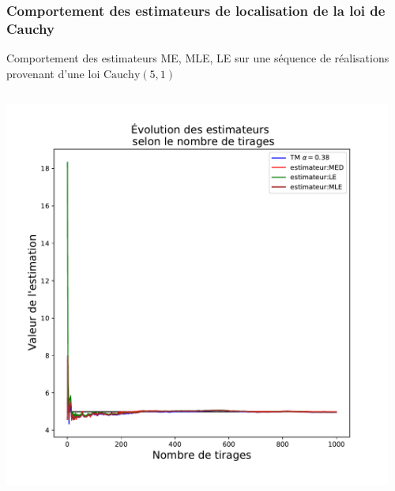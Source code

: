 \documentclass[8pt, sans]{beamer}
\begin{document}
\begin{frame}

\frametitle{Comportement des estimateurs de localisation de la loi de Cauchy }
Comportement des estimateurs ME, MLE, LE sur une séquence de réalisations provenant d'une loi $\mathrm{Cauchy}(5,1)$

\pause

\begin{columns}[T] %

\begin{column}{0.5\linewidth}

\includegraphics[scale=0.3]{Est-1000.pdf}

\end{column}

\pause
\hfill

\begin{column}{0.5\linewidth}


\end{column}
\end{columns}
\end{frame}
\end{document}
